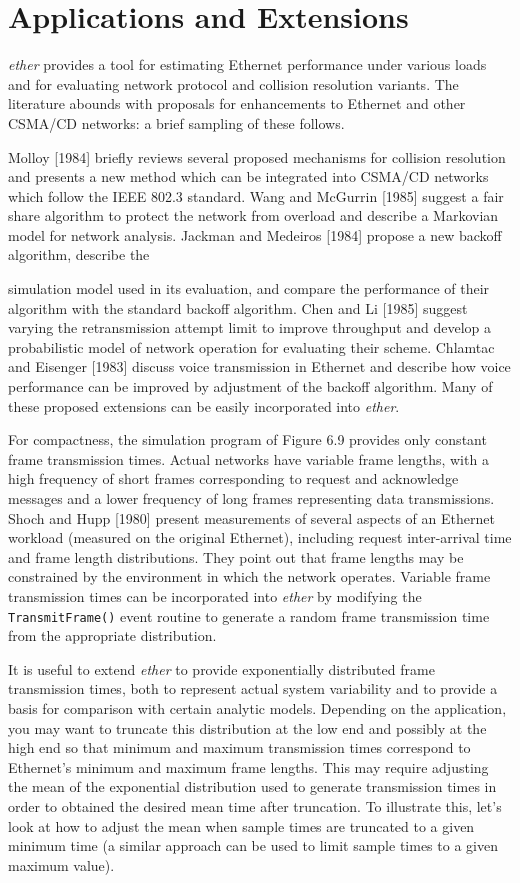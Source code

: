 \section{Applications and Extensions}

\emph{ether} provides a tool for estimating Ethernet performance under various loads and for evaluating network protocol and collision resolution variants. The literature abounds with proposals for enhancements to Ethernet and other CSMA/CD networks: a brief sampling of these follows.

Molloy [1984] briefly reviews several proposed mechanisms for collision resolution and presents a new method which can be integrated into CSMA/CD networks which follow the IEEE 802.3 standard. Wang and McGurrin [1985] suggest a fair share algorithm to protect the network from overload and describe a Markovian model for network analysis. Jackman and Medeiros [1984] propose a new backoff algorithm, describe the

\noindent simulation model used in its evaluation, and compare the performance of their algorithm with the standard backoff algorithm. Chen and Li [1985] suggest varying the retransmission attempt limit to improve throughput and develop a probabilistic model of network operation for evaluating their scheme. Chlamtac and Eisenger [1983] discuss voice transmission in Ethernet and describe how voice performance can be improved by adjustment of the backoff algorithm. Many of these proposed extensions can be easily incorporated into \emph{ether}.

For compactness, the simulation program of Figure 6.9 provides only constant frame transmission times. Actual networks have variable frame lengths, with a high frequency of short frames corresponding to request and acknowledge messages and a lower frequency of long frames representing data transmissions. Shoch and Hupp [1980] present measurements of several aspects of an Ethernet workload (measured on the original Ethernet), including request inter-arrival time and frame length distributions. They point out that frame lengths may be constrained by the environment in which the network operates. Variable frame transmission times can be incorporated into \emph{ether} by modifying the \texttt{TransmitFrame()} event routine to generate a random frame transmission time from the appropriate distribution.

It is useful to extend \emph{ether} to provide exponentially distributed frame transmission times, both to represent actual system variability and to provide a basis for comparison with certain analytic models. Depending on the application, you may want to truncate this distribution at the low end and possibly at the high end so that minimum and maximum transmission times correspond to Ethernet's minimum and maximum frame lengths. This may require adjusting the mean of the exponential distribution used to generate transmission times in order to obtained the desired mean time after truncation. To illustrate this, let's look at how to adjust the mean when sample times are truncated to a given minimum time (a similar approach can be used to limit sample times to a given maximum value).

